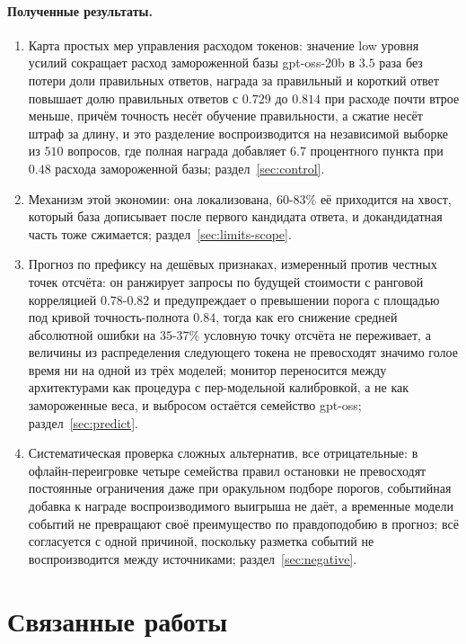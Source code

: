 \documentclass[11pt]{article}
\begin{document}
\paragraph{Полученные результаты.}
\begin{enumerate}
\item Карта простых мер управления расходом токенов: значение low уровня усилий сокращает расход замороженной базы gpt-oss-20b в $3.5$ раза без потери доли правильных ответов, награда за правильный и короткий ответ повышает долю правильных ответов с $0.729$ до $0.814$ при расходе почти втрое меньше, причём точность несёт обучение правильности, а сжатие несёт штраф за длину, и это разделение воспроизводится на независимой выборке из $510$ вопросов, где полная награда добавляет $6.7$ процентного пункта при $0.48$ расхода замороженной базы; раздел~\ref{sec:control}.
\item Механизм этой экономии: она локализована, $60$-$83\%$ её приходится на хвост, который база дописывает после первого кандидата ответа, и докандидатная часть тоже сжимается; раздел~\ref{sec:limits-scope}.
\item Прогноз по префиксу на дешёвых признаках, измеренный против честных точек отсчёта: он ранжирует запросы по будущей стоимости с ранговой корреляцией $0.78$-$0.82$ и предупреждает о превышении порога с площадью под кривой точность-полнота $0.84$, тогда как его снижение средней абсолютной ошибки на $35$-$37\%$ условную точку отсчёта не переживает, а величины из распределения следующего токена не превосходят значимо голое время ни на одной из трёх моделей; монитор переносится между архитектурами как процедура с пер-модельной калибровкой, а не как замороженные веса, и выбросом остаётся семейство gpt-oss; раздел~\ref{sec:predict}.
\item Систематическая проверка сложных альтернатив, все отрицательные: в офлайн-переигровке четыре семейства правил остановки не превосходят постоянные ограничения даже при оракульном подборе порогов, событийная добавка к награде воспроизводимого выигрыша не даёт, а временные модели событий не превращают своё преимущество по правдоподобию в прогноз; всё согласуется с одной причиной, поскольку разметка событий не воспроизводится между источниками; раздел~\ref{sec:negative}.
\end{enumerate}

\section{Связанные работы}
\end{document}
